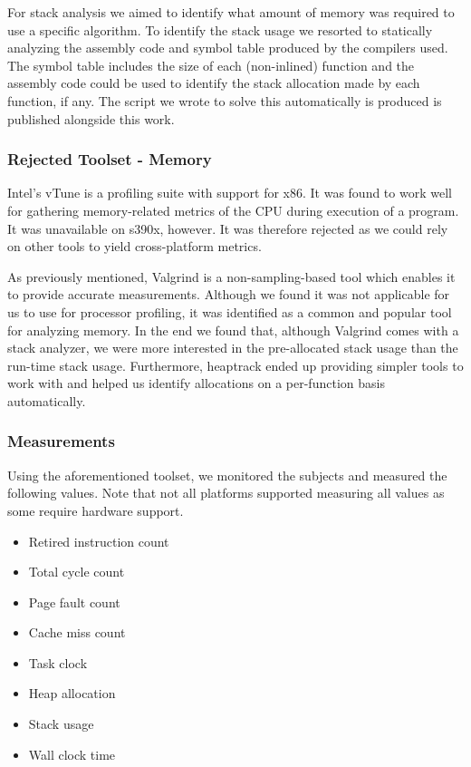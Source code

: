 For stack analysis we aimed to identify what amount of memory was required to use a specific algorithm. To identify the stack usage we resorted to statically analyzing the assembly code and symbol table produced by the compilers used. The symbol table includes the size of each (non-inlined) function and the assembly code could be used to identify the stack allocation made by each function, if any. The script we wrote to solve this automatically is produced is published alongside this work.

\subsubsection{Rejected Toolset - Memory}
\label{section:method:experiment:phase1:rejected-toolset-memory}

Intel's vTune is a profiling suite with support for x86. It was found to work well for gathering memory-related metrics of the CPU during execution of a program. It was unavailable on \gls{s390x}, however. It was therefore rejected as we could rely on other tools to yield cross-platform metrics. 

As previously mentioned, Valgrind is a non-sampling-based tool which enables it to provide accurate measurements. Although we found it was not applicable for us to use for processor profiling, it was identified as a common and popular tool for analyzing memory. In the end we found that, although Valgrind comes with a stack analyzer, we were more interested in the pre-allocated stack usage than the run-time stack usage. Furthermore, heaptrack ended up providing simpler tools to work with and helped us identify allocations on a per-function basis automatically.

\subsubsection{Measurements}
\label{section:method:experiment:phase1:measurements}

Using the aforementioned toolset, we monitored the subjects and measured the following values. Note that not all platforms supported measuring all values as some require hardware support.

\begin{itemize}
    \item Retired instruction count
    \item Total cycle count
    \item Page fault count
    \item Cache miss count
    \item Task clock
    \item Heap allocation
    \item Stack usage
    \item Wall clock time
\end{itemize}

